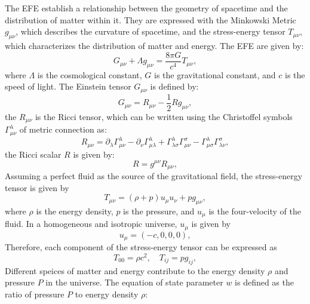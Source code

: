 The EFE establish a relationship between the geometry of spacetime and the distribution of matter within it. They are expressed with the Minkowski Metric $g_{\mu\nu}$, which describes the curvature of spacetime, and the stress-energy tensor $T_{\mu\nu}$, which characterizes the distribution of matter and energy. The EFE are given by:
\begin{equation}
    G_{\mu\nu} + \Lambda g_{\mu\nu}= \frac{8\pi G}{c^4} T_{\mu\nu},
    \label{eq:einstein_field_equations}
\end{equation}
where $\Lambda$ is the cosmological constant, $G$ is the gravitational constant, and $c$ is the speed of light. The Einstein tensor $G_{\mu\nu}$ is defined by:
\begin{equation}
    G_{\mu\nu} = R_{\mu\nu} - \frac{1}{2} R g_{\mu\nu},
    \label{eq:einstein_tensor}
\end{equation}
the $R_{\mu\nu}$ is the Ricci tensor, which can be written using the Christoffel symbols $\Gamma^\lambda_{\mu\nu}$ of metric connection as:
\begin{equation}
    R_{\mu\nu} = \partial_\lambda \Gamma^\lambda_{\mu\nu} - \partial_\nu \Gamma^\lambda_{\mu\lambda} + \Gamma^\lambda_{\lambda\sigma} \Gamma^\sigma_{\mu\nu} - \Gamma^\lambda_{\mu\sigma} \Gamma^\sigma_{\lambda\nu},
    \label{eq:ricci_curvature_tensor}
\end{equation}
the Ricci scalar $R$ is given by:
\begin{equation}
    R = g^{\mu\nu} R_{\mu\nu},
    \label{eq:ricci_scalar}
\end{equation}
Assuming a perfect fluid as the source of the gravitational field, the stress-energy tensor is given by
\begin{equation}
    T_{\mu\nu} = \left(\rho + p \right) u_{\mu} u_{\nu} + p g_{\mu\nu},
    \label{eq:stress_energy_tensor}
\end{equation}
where \( \rho \) is the energy density, \( p \) is the pressure, and \( u_{\mu} \) is the four-velocity of the fluid.
In a homogeneous and isotropic universe, \( u_{\mu} \) is given by
\begin{equation}
    u_{\mu} = (-c, 0, 0, 0),
    \label{eq:four_velocity}
\end{equation}
Therefore, each component of the stress-energy tensor can be expressed as
\begin{equation}
    T_{00} = \rho c^2, \quad T_{ij} = p g_{ij},
    \label{eq:stress_energy_components}
\end{equation}
Different speices of matter and energy contribute to the energy density \( \rho \) and pressure \( P \) in the universe. The equation of state parameter \( w \) is defined as the ratio of pressure \( P \) to energy density \( \rho \):
